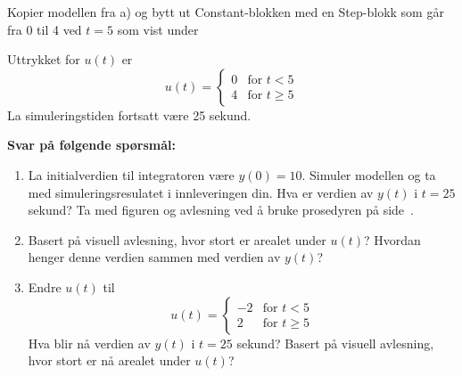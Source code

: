 
\item
  Kopier modellen fra a) og bytt ut {\sf Constant}-blokken 
 med en {\sf Step}-blokk som går fra 0 til  4 ved $t{=}5$ som vist
  under
  \begin{figure}[H]
    \centering
    \hspace*{0mm}
  \end{figure}
  Uttrykket for $u(t)$ er 
  \begin{equation}
    u(t) =
    \begin{cases}%
      0 & \text{for } t< 5\\
      4  & \text{for } t \geq 5 
    \end{cases}
  \end{equation}
    {\color{red}La simuleringstiden fortsatt være 25 sekund.}

{\bf Svar på følgende spørsmål:    }

  \begin{enumerate}[label=b\arabic*)]
  \item  La initialverdien til integratoren være $y(0){=}10$.
    Simuler modellen og ta med simuleringsresulatet
    i innleveringen din.  Hva er verdien av $y(t)$ i $t{=}25$ sekund?
    Ta med figuren og avlesning
 ved å bruke prosedyren på
     side~\pageref{page:prosedyre}.

   \item Basert på visuell avlesning, hvor stort er arealet under
    $u(t)$? Hvordan henger denne verdien sammen med verdien av $y(t)$?
\item   Endre  $u(t)$ til 
  \begin{equation}
    u(t) =
    \begin{cases}%
      -2 & \text{for } t< 5\\
      2  & \text{for } t \geq 5 
    \end{cases}
  \end{equation}
   Hva blir nå verdien av $y(t)$ i $t{=}25$ sekund?
 Basert på visuell avlesning, hvor stort er nå arealet under $u(t)$?

  \end{enumerate}
